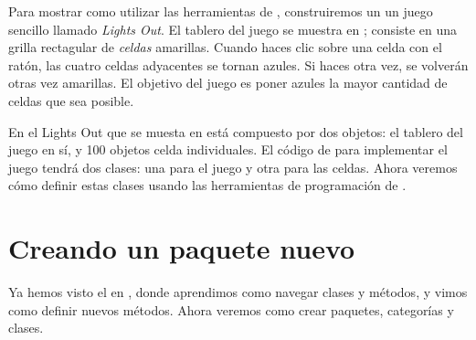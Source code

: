 \documentclass[a4paper,10pt,twoside]{book}
\begin{document}
Para mostrar como utilizar las herramientas de \pharo, construiremos un un juego
sencillo llamado \emph{Lights Out}. El tablero del juego se muestra en ;
consiste en una grilla rectagular de \emph{celdas} amarillas. Cuando haces clic
sobre una celda con el rat\'on, las cuatro celdas adyacentes se tornan azules. Si
haces \Click otra vez, se volver\'an otras vez amarillas. El objetivo del juego
es poner azules la mayor cantidad de celdas que sea posible.

En el Lights Out que se muesta en  est\'a compuesto por
dos objetos: el tablero del juego en s\'i, y 100 objetos celda individuales. El
c\'odigo de \pharo para implementar el juego tendr\'a dos clases: una para el
juego y otra para las celdas. Ahora veremos c\'omo definir estas clases usando
las herramientas de programaci\'on de \pharo.

\section{Creando un paquete nuevo}

Ya hemos visto el  en , donde aprendimos como
navegar clases y m\'etodos, y vimos como definir nuevos m\'etodos. Ahora veremos
como crear paquetes, categor\'ias y clases.


\end{document}
